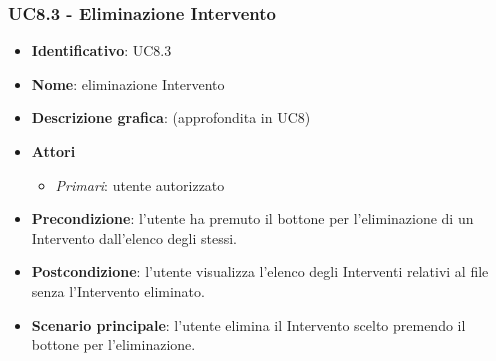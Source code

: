 \subsubsection{UC8.3 - Eliminazione Intervento}
\begin{itemize}
  \item \textbf{Identificativo}: UC8.3
  \item \textbf{Nome}: eliminazione Intervento
  \item \textbf{Descrizione grafica}: (approfondita in UC8)
  \item \textbf{Attori}
        \begin{itemize}
          \item \textit{Primari}: utente autorizzato
        \end{itemize}
  \item \textbf{Precondizione}: l'utente ha premuto il bottone per l'eliminazione di un Intervento dall'elenco degli stessi.
  \item \textbf{Postcondizione}: l'utente visualizza l'elenco degli Interventi relativi al file senza l'Intervento eliminato.
  \item \textbf{Scenario principale}: l'utente elimina il Intervento scelto premendo il bottone per l'eliminazione.
\end{itemize}
\newpage